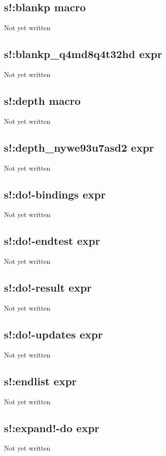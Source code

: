 \documentclass[a4paper,11pt]{article}
\begin{document}
\subsection{\ttfamily s!:blankp macro}
Not yet written

\subsection{\ttfamily s!:blankp\_q4md8q4t32hd expr}
Not yet written

\subsection{\ttfamily s!:depth macro}
Not yet written

\subsection{\ttfamily s!:depth\_nywe93u7asd2 expr}
Not yet written

\subsection{\ttfamily s!:do!-bindings expr}
Not yet written

\subsection{\ttfamily s!:do!-endtest expr}
Not yet written

\subsection{\ttfamily s!:do!-result expr}
Not yet written

\subsection{\ttfamily s!:do!-updates expr}
Not yet written

\subsection{\ttfamily s!:endlist expr}
Not yet written

\subsection{\ttfamily s!:expand!-do expr}
Not yet written
\end{document}
